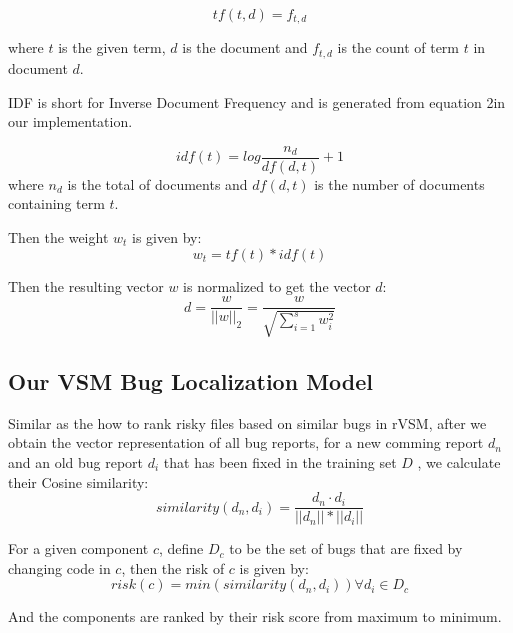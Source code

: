 \begin{equation}
	tf(t,d) = f_{t,d}
\end{equation}

where $t$ is the given term, $d$ is the document and $f_{t,d}$ is the count of term $t$ in document $d$.

IDF is short for Inverse Document Frequency and is generated from equation 2in our implementation.

\begin{equation}
	idf(t) = log\frac{n_d}{df(d,t)} +1
\end{equation}
where $n_d$ is the total of documents and $df(d,t)$ is the number of documents containing term $t$.

Then the weight $w_t$ is given by:
\begin{equation}
	w_t = tf(t)*idf(t)
\end{equation}
 
Then the resulting vector $w$ is normalized to get the vector $d$:
\begin{equation}
	d = \frac{w}{||w||_2} = \frac{w}{\sqrt{\sum_{i=1}^{s}w_i^2}}
\end{equation} 


\subsection{Our VSM Bug Localization Model}
Similar as the how to rank risky files based on similar bugs in rVSM\cite{zhou2012should},
after we obtain the vector representation of all bug reports, for a new comming report $d_n$ and an old bug report $d_i$ that has been fixed in the training set $D$ , we calculate their Cosine similarity:
\begin{equation}
	similarity(d_n,d_i) = \frac{d_n \cdot d_i}{||d_n||*||d_i||}
\end{equation}

For a given component $c$, define $D_c$ to be the set of bugs that are fixed by changing code in $c$,  then the risk of $c$ is given by:
\begin{equation}
	risk(c) = min(similarity(d_n,d_i)) \forall d_i \in D_c
\end{equation}

And the components are ranked by their risk score from maximum to minimum.





